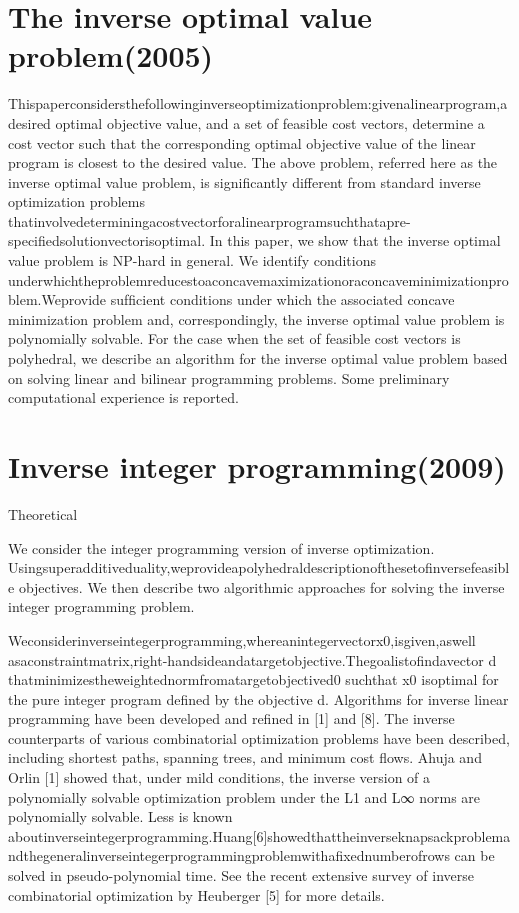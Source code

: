 \documentclass[UTF8]{article}
\begin{document}
\section{The inverse optimal value problem(2005)}

Thispaperconsidersthefollowinginverseoptimizationproblem:givenalinearprogram,adesired optimal objective value, and a set of feasible cost vectors, determine a cost vector such that the corresponding optimal objective value of the linear program is closest to the desired value.
The above problem, referred here as the inverse optimal value problem, is signiﬁcantly different from standard inverse optimization problems thatinvolvedeterminingacostvectorforalinearprogramsuchthatapre-speciﬁedsolutionvectorisoptimal. In this paper, we show that the inverse optimal value problem is NP-hard in general. We identify conditions underwhichtheproblemreducestoaconcavemaximizationoraconcaveminimizationproblem.Weprovide sufﬁcient conditions under which the associated concave minimization problem and, correspondingly, the inverse optimal value problem is polynomially solvable. For the case when the set of feasible cost vectors is polyhedral, we describe an algorithm for the inverse optimal value problem based on solving linear and bilinear programming problems. Some preliminary computational experience is reported.


\section{Inverse integer programming(2009)}

Theoretical

We consider the integer programming version of inverse optimization. Usingsuperadditiveduality,weprovideapolyhedraldescriptionofthesetofinversefeasible objectives. We then describe two algorithmic approaches for solving the inverse integer programming problem.

Weconsiderinverseintegerprogramming,whereanintegervectorx0,isgiven,aswell asaconstraintmatrix,right-handsideandatargetobjective.Thegoalistoﬁndavector d thatminimizestheweightednormfromatargetobjectived0 suchthat x0 isoptimal for the pure integer program deﬁned by the objective d. Algorithms for inverse linear programming have been developed and reﬁned in [1] and [8]. The inverse counterparts of various combinatorial optimization problems have been described, including shortest paths, spanning trees, and minimum cost ﬂows. Ahuja and Orlin [1] showed that, under mild conditions, the inverse version of a polynomially solvable optimization problem under the L1 and L∞ norms are polynomially solvable. Less is known aboutinverseintegerprogramming.Huang[6]showedthattheinverseknapsackproblemandthegeneralinverseintegerprogrammingproblemwithaﬁxednumberofrows can be solved in pseudo-polynomial time. See the recent extensive survey of inverse combinatorial optimization by Heuberger [5] for more details.
\end{document}
